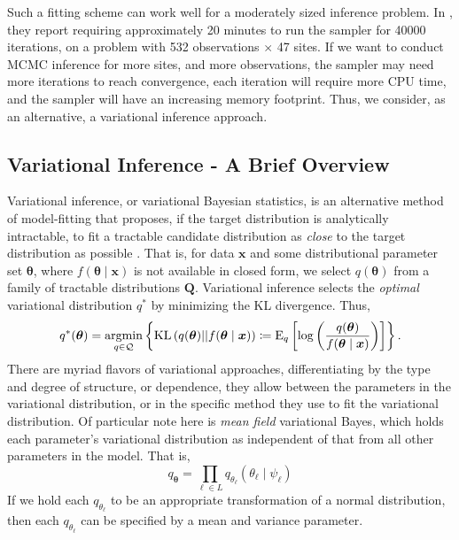 Such a fitting scheme can work well for a moderately sized inference problem.  In \cite{trubey:pg},
    they report requiring approximately \num{20} minutes to run the sampler for \num{40000} iterations, 
    on a problem with \num{532} observations $\times$ \num{47} sites.  If we want to conduct
    MCMC inference for more sites, and more observations, the sampler may need more iterations to
    reach convergence, each iteration will require more CPU time, and the sampler will have an 
    increasing memory footprint. Thus, we consider, as an alternative, a variational inference approach.

\subsection{Variational Inference - A Brief Overview\label{sec:varbayes}}
Variational inference, or variational Bayesian statistics, is an alternative method of 
    model-fitting that proposes, if the target distribution is analytically intractable,
    to fit a tractable candidate distribution as \emph{close} to the target distribution
    as possible \citep{blei2017}. That is, for data $\bm{x}$ and some 
    distributional parameter set $\bm{\theta}$, where $f(\bm{\theta}\mid \bm{x})$ is not 
    available in closed form, we select $q(\bm{\theta})$ from a family of tractable distributions
    $\bm{Q}$.  Variational inference selects the \emph{optimal} variational distribution $q^*$
    by minimizing the KL divergence.  Thus,
    \begin{equation}
        \label{eqn:optimalq}
        q^*(\bm{\theta}) = \operatorname*{argmin}_{q\in\mathcal{Q}}\left\lbrace
        \text{KL}\left(q(\bm{\theta})||f(\bm{\theta}\mid\bm{x})\right) 
        \coloneqq
        \text{E}_{q}\left[\log\left(
        \frac{q(\bm{\theta})}{f(\bm{\theta}\mid\bm{x})}
        \right)\right]
        \right\rbrace.
    \end{equation}
    There are myriad flavors of variational approaches, differentiating by
    the type and degree of structure, or dependence, they allow between the parameters in
    the variational distribution, or in the specific method they use to fit the variational
    distribution.  Of particular note here is \emph{mean field} variational Bayes, which 
    holds each parameter's variational distribution as independent of that from all other 
    parameters in the model.  That is,
    \[
        q_{\bm{\theta}} = \prod_{\ell \in L}q_{\theta_{\ell}}(\theta_{\ell}\mid\psi_{\ell})
    \]
    If we hold each $q_{\theta_{\ell}}$ to be an appropriate transformation of a normal
    distribution, then each $q_{\theta_{\ell}}$ can be specified by a mean and variance 
    parameter. 

